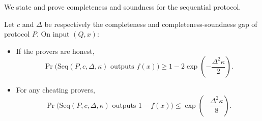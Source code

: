 \documentclass{toc}
\begin{document}
\noindent We state and prove completeness and soundness for the sequential protocol.

\begin{theorem}
  Let $c$ and $\Delta$ be respectively %
the completeness and completeness-soundness gap
of %
protocol $P$.
On input $(Q,x)$:
\begin{itemize}
\item If the provers are honest, $$ \Pr\big(\mbox{Seq}(P, c, \Delta, \kappa) \mbox{  outputs } f(x)\big) \geq 1 - 2\exp \left(-\frac{\Delta^2\kappa}{2}\right) .$$ 
\item For any cheating provers, $$\Pr\big(\mbox{Seq}(P, c, \Delta, \kappa) \mbox{  outputs } 1-f(x)\big) \leq \exp \left(-\frac{\Delta^2\kappa}{8}\right) .$$
\end{itemize}

\end{theorem}
\end{document}
